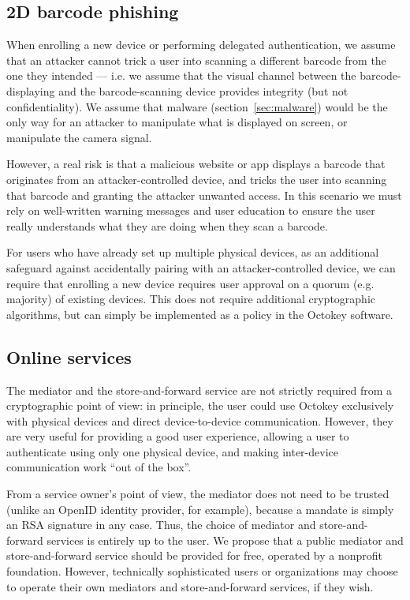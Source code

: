 \subsection{2D barcode phishing}\label{sec:barcode-phishing}

When enrolling a new device or performing delegated authentication, we assume that an attacker
cannot trick a user into scanning a different barcode from the one they intended --- i.e. we assume
that the visual channel between the barcode-displaying and the barcode-scanning device provides
integrity (but not confidentiality). We assume that malware (section~\ref{sec:malware}) would be the
only way for an attacker to manipulate what is displayed on screen, or manipulate the camera signal.

However, a real risk is that a malicious website or app displays a barcode that originates from an
attacker-controlled device, and tricks the user into scanning that barcode and granting the attacker
unwanted access. In this scenario we must rely on well-written warning messages and user education
to ensure the user really understands what they are doing when they scan a barcode.

For users who have already set up multiple physical devices, as an additional safeguard against
accidentally pairing with an attacker-controlled device, we can require that enrolling a new device
requires user approval on a quorum (e.g. majority) of existing devices. This does not require
additional cryptographic algorithms, but can simply be implemented as a policy in the Octokey
software.

\subsection{Online services}\label{sec:mediator-sec}

The mediator and the store-and-forward service are not strictly required from a cryptographic point
of view: in principle, the user could use Octokey exclusively with physical devices and direct
device-to-device communication. However, they are very useful for providing a good user experience,
allowing a user to authenticate using only one physical device, and making inter-device
communication work ``out of the box''.

From a service owner's point of view, the mediator does not need to be trusted (unlike an OpenID
identity provider, for example), because a mandate is simply an RSA signature in any case. Thus, the
choice of mediator and store-and-forward services is entirely up to the user. We propose that a
public mediator and store-and-forward service should be provided for free, operated by a nonprofit
foundation. However, technically sophisticated users or organizations may choose to operate their
own mediators and store-and-forward services, if they wish.

